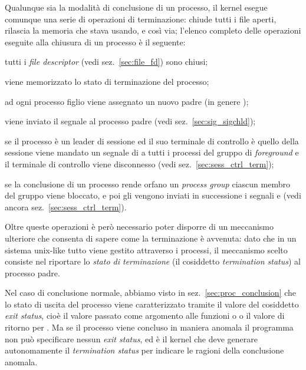 Qualunque sia la modalità di conclusione di un processo, il kernel esegue
comunque una serie di operazioni di terminazione: chiude tutti i file aperti,
rilascia la memoria che stava usando, e così via; l'elenco completo delle
operazioni eseguite alla chiusura di un processo è il seguente:
\begin{itemize*}
\item tutti i \textit{file descriptor} (vedi sez.~\ref{sec:file_fd}) sono
  chiusi;
\item viene memorizzato lo stato di terminazione del processo;
\item ad ogni processo figlio viene assegnato un nuovo padre (in genere
  );
\item viene inviato il segnale  al processo padre (vedi
  sez.~\ref{sec:sig_sigchld});
\item se il processo è un leader di sessione ed il suo terminale di controllo
  è quello della sessione viene mandato un segnale di  a tutti i
  processi del gruppo di \textit{foreground} e il terminale di controllo viene
  disconnesso (vedi sez.~\ref{sec:sess_ctrl_term});
\item se la conclusione di un processo rende orfano un \textit{process
    group} ciascun membro del gruppo viene bloccato, e poi gli vengono
  inviati in successione i segnali  e 
  (vedi ancora sez.~\ref{sec:sess_ctrl_term}).
\end{itemize*}


Oltre queste operazioni è però necessario poter disporre di un meccanismo
ulteriore che consenta di sapere come la terminazione è avvenuta: dato che in
un sistema unix-like tutto viene gestito attraverso i processi, il meccanismo
scelto consiste nel riportare lo \textsl{stato di terminazione} (il cosiddetto
\textit{termination status}) al processo padre.

Nel caso di conclusione normale, abbiamo visto in
sez.~\ref{sec:proc_conclusion} che lo stato di uscita del processo viene
caratterizzato tramite il valore del cosiddetto \textit{exit status}, cioè il
valore passato come argomento alle funzioni  o  o il
valore di ritorno per .  Ma se il processo viene concluso in
maniera anomala il programma non può specificare nessun \textit{exit status},
ed è il kernel che deve generare autonomamente il \textit{termination status}
per indicare le ragioni della conclusione anomala.

